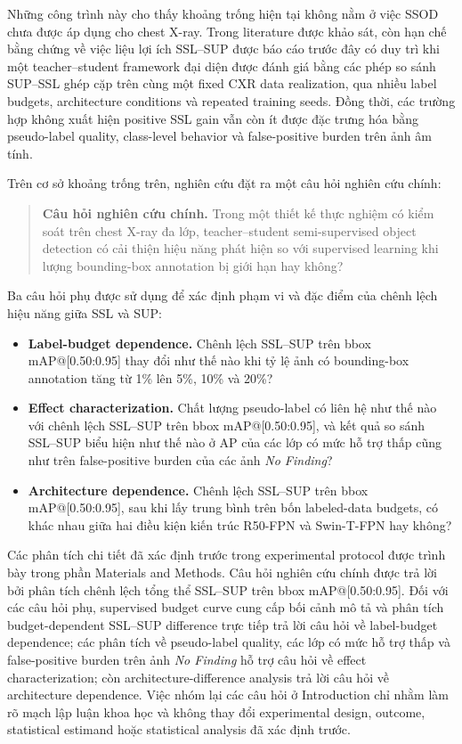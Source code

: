 \documentclass[pdflatex,sn-mathphys-num]{sn-jnl}%
\theoremstyle{thmstyleone}%
\theoremstyle{thmstyletwo}%
\theoremstyle{thmstylethree}%
\begin{document}
Những công trình này cho thấy khoảng trống hiện tại không nằm ở việc SSOD chưa
được áp dụng cho chest X-ray. Trong literature được khảo sát, còn hạn chế bằng
chứng về việc liệu lợi ích SSL--SUP được báo cáo trước đây có duy trì khi một
teacher--student framework đại diện được đánh giá bằng các phép so sánh
SUP--SSL ghép cặp trên cùng một fixed CXR data realization, qua nhiều label
budgets, architecture conditions và repeated training seeds. Đồng thời, các
trường hợp không xuất hiện positive SSL gain vẫn còn ít được đặc trưng hóa bằng
pseudo-label quality, class-level behavior và false-positive burden trên ảnh
âm tính.

Trên cơ sở khoảng trống trên, nghiên cứu đặt ra một câu hỏi nghiên cứu chính:

\begin{quote}
\textbf{Câu hỏi nghiên cứu chính.}
Trong một thiết kế thực nghiệm có kiểm soát trên chest X-ray đa lớp,
teacher--student semi-supervised object detection có cải thiện hiệu năng phát
hiện so với supervised learning khi lượng bounding-box annotation bị giới hạn
hay không?
\end{quote}
Ba câu hỏi phụ được sử dụng để xác định phạm vi và đặc điểm của chênh lệch hiệu năng giữa SSL và SUP:

\begin{itemize}

    \item \textbf{Label-budget dependence.}
    Chênh lệch SSL--SUP trên bbox mAP@[0.50:0.95] thay đổi như thế nào khi tỷ lệ ảnh có bounding-box
    annotation tăng từ 1\% lên 5\%, 10\% và 20\%?

    \item \textbf{Effect characterization.}
    Chất lượng pseudo-label có liên hệ như thế nào với chênh lệch SSL--SUP trên bbox mAP@[0.50:0.95], và
    kết quả so sánh SSL--SUP biểu hiện như thế nào ở AP của các lớp có mức hỗ trợ thấp cũng như
    trên false-positive burden của các ảnh \textit{No Finding}?

    \item \textbf{Architecture dependence.}
    Chênh lệch SSL--SUP trên bbox mAP@[0.50:0.95], sau khi lấy trung bình trên bốn labeled-data budgets, có khác nhau giữa hai điều kiện kiến trúc R50-FPN và
    Swin-T-FPN hay không?

\end{itemize}


Các phân tích chi tiết đã xác định trước trong experimental protocol được trình bày trong phần Materials and Methods. Câu hỏi nghiên
cứu chính được trả lời bởi phân tích chênh lệch tổng thể SSL--SUP trên bbox mAP@[0.50:0.95]. Đối với các
câu hỏi phụ, supervised budget curve cung cấp bối cảnh mô tả và phân tích
budget-dependent SSL--SUP difference trực tiếp trả lời câu hỏi về label-budget dependence; các phân tích về
pseudo-label quality, các lớp có mức hỗ trợ thấp và false-positive burden trên
ảnh \textit{No Finding} hỗ trợ câu hỏi về effect characterization; còn architecture-difference analysis trả
lời câu hỏi về architecture dependence. Việc nhóm lại các câu hỏi ở Introduction chỉ nhằm làm rõ mạch lập luận khoa học và không thay đổi experimental design, outcome, statistical estimand hoặc statistical analysis đã xác định trước.
\end{document}
